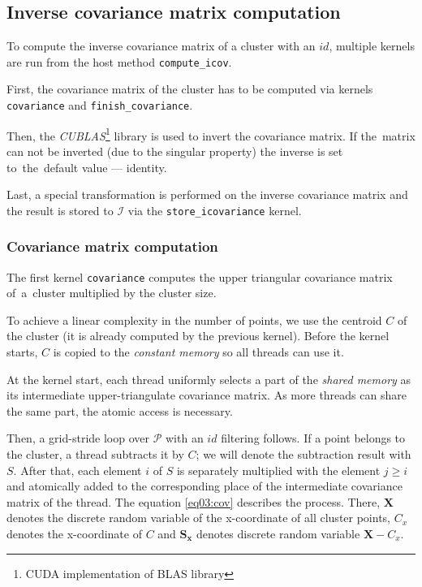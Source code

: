 \subsection{Inverse covariance matrix computation}


To compute the inverse covariance matrix of a cluster with an $id$, multiple kernels are run from the host method \texttt{compute\_icov}. 

First, the covariance matrix of the cluster has to be computed via kernels \texttt{covariance} and \texttt{finish\_covariance}. 

Then, the \emph{CUBLAS}\footnote{CUDA implementation of BLAS library} library is used to invert the covariance matrix. If the~matrix can not be inverted (due to the singular property) the inverse is set to~the~default value --- identity. 

Last, a special transformation is performed on the inverse covariance matrix and the result is stored to $\mathcal{I}$ via the \texttt{store\_icovariance} kernel.

\subsubsection{Covariance matrix computation}

The first kernel \texttt{covariance} computes the upper triangular covariance matrix of~a~cluster multiplied by the cluster size. 

To achieve a linear complexity in the number of points, we use the centroid $C$ of the cluster (it is already computed by the previous kernel). Before the kernel starts, $C$ is copied to the \emph{constant memory} so all threads can use it.

At the kernel start, each thread uniformly selects a part of the \emph{shared memory} as its intermediate upper-triangulate covariance matrix. As more threads can share the same part, the atomic access is necessary.

Then, a grid-stride loop over $\mathcal{P}$ with an $id$ filtering follows. If a point belongs to the cluster, a thread subtracts it by $C$; we will denote the subtraction result with $S$. After that, each element $i$ of $S$ is separately multiplied with the element $j \ge i$ and atomically added to the corresponding place of the intermediate covariance matrix of the thread. The equation \ref{eq03:cov} describes the process. There, $\textbf{X}$ denotes the discrete random variable of the x-coordinate of all cluster points, $C_x$ denotes the x-coordinate of $C$ and $\mathbf{S_x}$ denotes discrete random variable $\mathbf{X}-C_x$.

